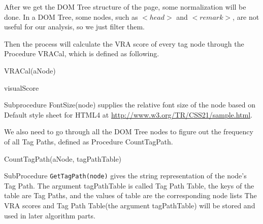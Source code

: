 After we get the DOM Tree structure of the page, 
some normalization will be done.
In a DOM Tree, some nodes, 
such as $<head>$ and $<remark>$,
are not useful for our analysis, 
so we just filter them.

Then the process will calculate the VRA score of every tag node through the Procedure VRACal, 
which is defined as following.

\begin{algorithm}[htbp]
\caption{VRACal(aNode)}
\begin{algorithmic}[1]\label{algo:vracal}
	\ENDFOR
{}		
	\RETURN visualScore
\ENDIF
\end{algorithmic}
\end{algorithm}

Subprocedure FontSize(node) supplies the relative font size of 
the node based on Default style sheet for HTML4 at
\url{http://www.w3.org/TR/CSS21/sample.html}. 

We also need to go through all the DOM Tree nodes to figure out 
the frequency of all Tag Paths, defined as Procedure CountTagPath.

\begin{algorithm}[htbp]
\caption{CountTagPath(aNode, tagPathTable)}
\begin{algorithmic}[1]\label{algo:counttagpath}
	\ELSE	
	\ENDIF
		\ENDFOR
	\ENDIF
	\RETURN 
\end{algorithmic}
\end{algorithm}

SubProcedure {\tt GetTagPath(node)} gives the string representation 
of the node's Tag Path. The argument tagPathTable is called Tag Path Table, 
the keys of the table are Tag Paths,
and the values of table are the corresponding node lists
The VRA scores and Tag Path Table(the argument tagPathTable) will 
be stored and used in later algorithm parts.


